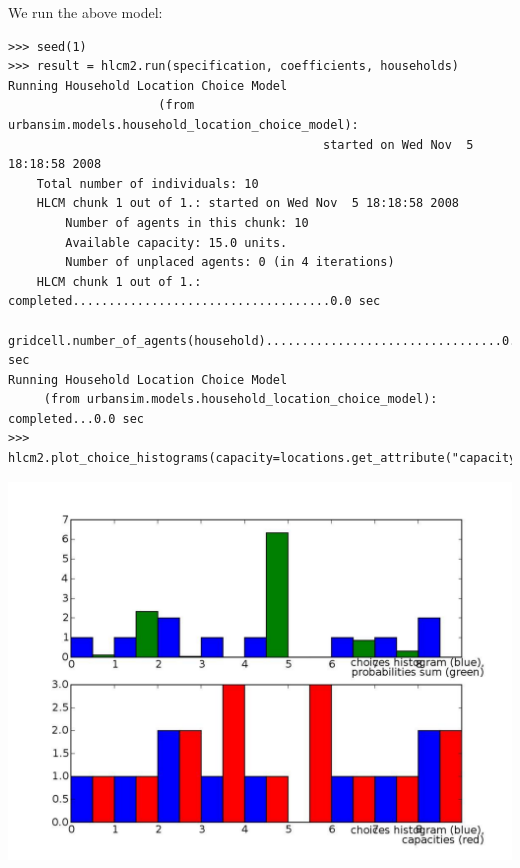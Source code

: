 We run the above model:
\begin{verbatim}
>>> seed(1)
>>> result = hlcm2.run(specification, coefficients, households)
Running Household Location Choice Model 
                     (from urbansim.models.household_location_choice_model): 
                                            started on Wed Nov  5 18:18:58 2008
    Total number of individuals: 10
    HLCM chunk 1 out of 1.: started on Wed Nov  5 18:18:58 2008
        Number of agents in this chunk: 10
        Available capacity: 15.0 units.
        Number of unplaced agents: 0 (in 4 iterations)
    HLCM chunk 1 out of 1.: completed....................................0.0 sec
    gridcell.number_of_agents(household).................................0.0 sec
Running Household Location Choice Model 
     (from urbansim.models.household_location_choice_model): completed...0.0 sec
>>> hlcm2.plot_choice_histograms(capacity=locations.get_attribute("capacity"))
\end{verbatim}
\begin{center}
\includegraphics[scale=0.2, angle=0]{images/hlcm2hist.pdf}
\end{center}
